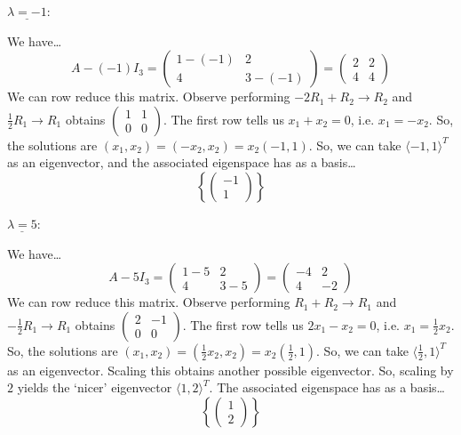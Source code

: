\documentclass[12pt,letterpaper]{exam}
\begin{document}
\begin{questions}
{$\underline{\lambda= -1} \colon$ \par
We have\dots
	\[
	A - (-1)I_3= \begin{pmatrix} 1 - (-1) & 2 \\ 4 & 3 - (-1) \end{pmatrix}= \begin{pmatrix} 2 & 2 \\ 4 & 4 \end{pmatrix}
	\]
We can row reduce this matrix. Observe performing $-2R_1 + R_2 \to R_2$ and $\frac{1}{2} R_1 \to R_1$ obtains $\begin{pmatrix} 1 & 1 \\ 0 & 0 \end{pmatrix}$. The first row tells us $x_1 + x_2= 0$, i.e. $x_1= -x_2$. So, the solutions are $(x_1, x_2)= (-x_2, x_2)= x_2 (-1, 1)$. So, we can take $\langle -1, 1 \rangle^T$ as an eigenvector, and the associated eigenspace has as a basis\dots 
	\[
	\boxed{\left\{ \begin{pmatrix} -1 \\ 1 \end{pmatrix} \right\}}
	\]

$\underline{\lambda= 5} \colon$ \par
We have\dots
	\[
	A - 5I_3= \begin{pmatrix} 1 - 5 & 2 \\ 4 & 3 - 5 \end{pmatrix}= \begin{pmatrix} -4 & 2 \\ 4 & -2 \end{pmatrix}
	\]
We can row reduce this matrix. Observe performing $R_1 + R_2 \to R_1$ and $-\frac{1}{2} R_1 \to R_1$ obtains $\begin{pmatrix} 2 & -1 \\ 0 & 0 \end{pmatrix}$. The first row tells us $2x_1 - x_2= 0$, i.e. $x_1= \frac{1}{2} x_2$. So, the solutions are $(x_1, x_2)= (\frac{1}{2} x_2, x_2)= x_2 (\frac{1}{2}, 1)$. So, we can take $\langle \frac{1}{2}, 1 \rangle^T$ as an eigenvector. Scaling this obtains another possible eigenvector. So, scaling by $2$ yields the `nicer' eigenvector $\langle 1, 2 \rangle^T$. The associated eigenspace has as a basis\dots 
	\[
	\boxed{\left\{ \begin{pmatrix} 1 \\ 2 \end{pmatrix} \right\}}
	\]%
}




\end{questions}
\end{document}
